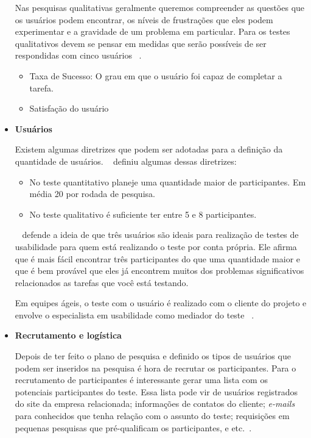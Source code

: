 \begin{itemize}
Nas pesquisas qualitativas geralmente queremos compreender as questões que os usuários podem encontrar, os níveis de frustrações que eles podem experimentar e a gravidade de um problema em particular. Para os testes qualitativos devem se pensar em medidas que serão possíveis de ser respondidas com cinco usuários ~\cite{unger2009}. 

	\begin{itemize}
		\item Taxa de Sucesso: O grau em que o usuário foi capaz de completar a tarefa.
		\item Satisfação do usuário
	\end{itemize}
	

\item \textbf{Usuários}

Existem algumas diretrizes que podem ser adotadas para a definição da quantidade de usuários. ~ definiu algumas dessas diretrizes:

\begin{itemize}
\item No teste quantitativo planeje uma quantidade maior de participantes. Em média 20 por rodada de pesquisa.
\item No teste qualitativo é suficiente ter entre 5 e 8 participantes.
\end{itemize}

	 ~ defende a ideia de que três usuários são ideais para realização de testes de usabilidade para quem está realizando o teste por conta própria. Ele afirma que é mais fácil encontrar três participantes do que uma quantidade maior e que é bem provável que eles já encontrem muitos dos problemas significativos relacionados as tarefas que você está testando.

	Em equipes ágeis, o teste com o usuário é realizado com o cliente do projeto e envolve o especialista em usabilidade como mediador do teste ~\cite{santos2012}.

\item \textbf{Recrutamento e logística}

Depois de ter feito o plano de pesquisa e definido os tipos de usuários que podem ser inseridos na pesquisa é hora de recrutar os participantes.
Para o recrutamento de participantes é interessante gerar uma lista com os potenciais participantes do teste. Essa lista pode vir de usuários registrados do site da empresa relacionada; informações de contatos do cliente; \textit{e-mails} para conhecidos que tenha relação com o assunto do teste; requisições em pequenas pesquisas que pré-qualificam os participantes, e etc.~\cite{unger2009}.


\end{itemize}
